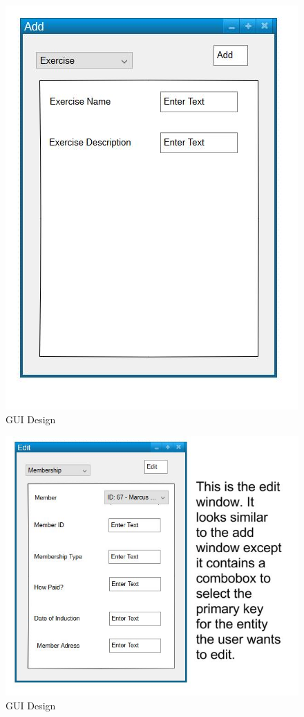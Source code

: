 \begin{figure}[H]
    \includegraphics[width=\textwidth]{Gui_6.JPG}
    \caption{GUI Design} \label{fig:GUI Designs}
\end{figure}

\begin{figure}[H]
    \includegraphics[width=\textwidth]{Gui_7.JPG}
    \caption{GUI Design} \label{fig:GUI Designs}
\end{figure}

